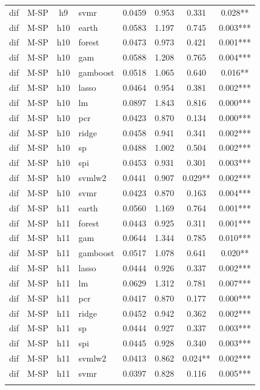 \begin{ThreePartTable}
\begin{longtable}[t]{llclcccc}
dif & M-SP & h9 & svmr & 0.0459 & 0.953 & 0.331 & 0.028**\\
\addlinespace
dif & M-SP & h10 & earth & 0.0583 & 1.197 & 0.745 & 0.003***\\
dif & M-SP & h10 & forest & 0.0473 & 0.973 & 0.421 & 0.001***\\
dif & M-SP & h10 & gam & 0.0588 & 1.208 & 0.765 & 0.004***\\
dif & M-SP & h10 & gamboost & 0.0518 & 1.065 & 0.640 & 0.016**\\
dif & M-SP & h10 & lasso & 0.0464 & 0.954 & 0.381 & 0.002***\\
dif & M-SP & h10 & lm & 0.0897 & 1.843 & 0.816 & 0.000***\\
dif & M-SP & h10 & pcr & 0.0423 & 0.870 & 0.134 & 0.000***\\
dif & M-SP & h10 & ridge & 0.0458 & 0.941 & 0.341 & 0.002***\\
dif & M-SP & h10 & sp & 0.0488 & 1.002 & 0.504 & 0.002***\\
dif & M-SP & h10 & spi & 0.0453 & 0.931 & 0.301 & 0.003***\\
dif & M-SP & h10 & svmlw2 & 0.0441 & 0.907 & 0.029** & 0.002***\\
dif & M-SP & h10 & svmr & 0.0423 & 0.870 & 0.163 & 0.004***\\
\addlinespace
dif & M-SP & h11 & earth & 0.0560 & 1.169 & 0.764 & 0.001***\\
dif & M-SP & h11 & forest & 0.0443 & 0.925 & 0.311 & 0.001***\\
dif & M-SP & h11 & gam & 0.0644 & 1.344 & 0.785 & 0.010***\\
dif & M-SP & h11 & gamboost & 0.0517 & 1.078 & 0.641 & 0.020**\\
dif & M-SP & h11 & lasso & 0.0444 & 0.926 & 0.337 & 0.002***\\
dif & M-SP & h11 & lm & 0.0629 & 1.312 & 0.781 & 0.007***\\
dif & M-SP & h11 & pcr & 0.0417 & 0.870 & 0.177 & 0.000***\\
dif & M-SP & h11 & ridge & 0.0452 & 0.942 & 0.362 & 0.002***\\
dif & M-SP & h11 & sp & 0.0444 & 0.927 & 0.337 & 0.003***\\
dif & M-SP & h11 & spi & 0.0445 & 0.928 & 0.340 & 0.003***\\
dif & M-SP & h11 & svmlw2 & 0.0413 & 0.862 & 0.024** & 0.002***\\
dif & M-SP & h11 & svmr & 0.0397 & 0.828 & 0.116 & 0.005***\\
\addlinespace

\end{longtable}
\end{ThreePartTable}
